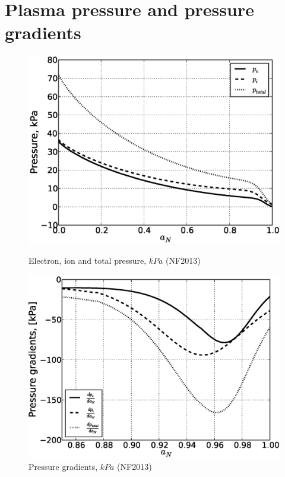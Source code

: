 \documentclass[11pt,oneside,a4paper,notitlepage]{article}
\begin{document}
\section{Plasma pressure and pressure gradients}
\begin{figure}[h]
\begin{center}
\begin{minipage}[ht]{0.4\linewidth} 
 \includegraphics[width=1.35\linewidth]{evans60/P60.eps}
 \caption{Electron, ion and total pressure, $kPa$ (NF2013)}
 \label{fig:P60}
\end{minipage}
\hfill
\begin{minipage}[ht]{0.4\linewidth} 
 \includegraphics[width=1.35\linewidth]{evans60/dP60.eps}
 \caption{Pressure gradients, $kPa$ (NF2013)}
 \label{fig:DP60}
\end{minipage}
\end{center}
\end{figure}
\newpage
\end{document}
